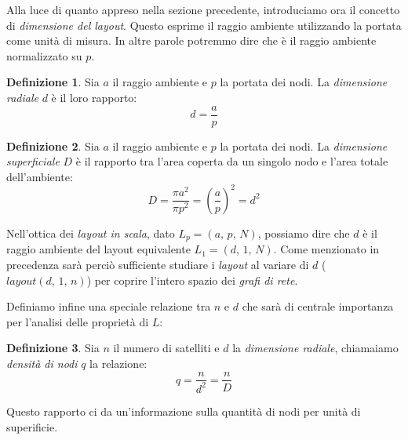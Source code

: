 \documentclass[a4paper,12pt]{article}
\theoremstyle{definition}
\newtheorem{definition}{Definizione}
\begin{document}

Alla luce di quanto appreso nella sezione precedente, introduciamo ora il concetto di \emph{dimensione del layout}. Questo esprime il raggio ambiente utilizzando la portata come unità di misura. In altre parole potremmo dire che è il raggio ambiente normalizzato su $p$.

\begin{definition}
Sia $a$ il raggio ambiente e $p$ la portata dei nodi. La \emph{dimensione radiale} $d$ è il loro rapporto:
\begin{equation*}
d = \frac{a}{p}
\end{equation*}
\end{definition}

\begin{definition}
Sia $a$ il raggio ambiente e $p$ la portata dei nodi. La \emph{dimensione superficiale} $D$ è il rapporto tra l'area coperta da un singolo nodo e l'area totale dell'ambiente:
\begin{equation*}
D = \frac{\pi a^2}{\pi p^2} = \left(\frac{a}{p}\right)^2 = d^2
\end{equation*}
\end{definition}

Nell'ottica dei \emph{layout in scala}, dato $L_p = (a,\,p,\,N)$, possiamo dire che $d$ è il raggio ambiente del layout equivalente $L_1 = (d,\,1,\,N)$. Come menzionato in precedenza sarà perciò sufficiente studiare i \emph{layout} al variare di $d$ ($layout(d,\,1,\,n)$) per coprire l'intero spazio dei \emph{grafi di rete}.


Definiamo infine una speciale relazione tra $n$ e $d$ che sarà di centrale importanza per l'analisi delle proprietà di $L$:

\begin{definition}
Sia $n$ il numero di satelliti e $d$ la \emph{dimensione radiale}, chiamaiamo \emph{densità di nodi} $q$ la relazione:
\begin{equation*}
q = \frac{n}{d^2} = \frac{n}{D}
\end{equation*}
\end{definition}

Questo rapporto ci da un'informazione sulla quantità di nodi per unità di superificie.
\end{document}

